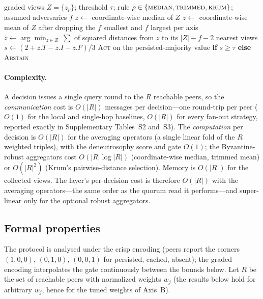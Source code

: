 \documentclass[11pt]{article}
\begin{document}
\begin{algorithm}[t]
\caption{Byzantine-robust freshness gate}
\label{alg:robust}
\begin{algorithmic}[1]
\Require graded views $Z=\{z_p\}$; threshold $\tau$; rule $\rho\in\{\textsc{median},\textsc{trimmed},\textsc{krum}\}$; assumed adversaries $f$
 \State $\bar z\gets$ coordinate-wise median of $Z$
 \State $\bar z\gets$ coordinate-wise mean of $Z$ after dropping the $f$ smallest and $f$ largest per axis
 \State $\bar z\gets \arg\min_{z\in Z}\ \textstyle\sum$ of squared distances from $z$ to its $|Z|-f-2$ nearest views
\EndIf
\State $s\gets(2+\bar z.T-\bar z.I-\bar z.F)/3$
\State \Return \textsc{Act} on the persisted-majority value \textbf{if} $s\ge\tau$ \textbf{else} \textsc{Abstain}
\end{algorithmic}
\end{algorithm}

\paragraph{Complexity.} A decision issues a single query round to the $R$ reachable peers, so the
\emph{communication} cost is $O(|R|)$ messages per decision---one round-trip per peer ($O(1)$ for the
local and single-hop baselines, $O(|R|)$ for every fan-out strategy, reported exactly in
Supplementary Tables~S2 and~S3). The \emph{computation} per decision is $O(|R|)$ for
the averaging operators (a single linear fold of the $R$ weighted triples), with the deneutrosophy score
and gate $O(1)$; the Byzantine-robust aggregators cost $O(|R|\log|R|)$ (coordinate-wise median, trimmed
mean) or $O(|R|^2)$ (Krum's pairwise-distance selection). Memory is $O(|R|)$ for the collected views. The
layer's per-decision cost is therefore $O(|R|)$ with the averaging operators---the same order as the
quorum read it performs---and super-linear only for the optional robust aggregators.

\subsection{Formal properties}
\label{sec:formal}
The protocol is analysed under the crisp encoding (peers report the corners $(1,0,0)$, $(0,1,0)$,
$(0,0,1)$ for persisted, cached, absent); the graded encoding interpolates the gate continuously
between the bounds below. Let $R$ be the set of reachable peers with normalized weights $w_j$ (the
results below hold for arbitrary $w_j$, hence for the tuned weights of Axis~B).
\end{document}
